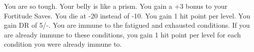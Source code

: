 {You are so tough. Your belly is like a prism.}
{You gain a +3 bonus to your Fortitude Saves.}
{You die at -20 instead of -10.}
{You gain 1 hit point per level.}
{You gain DR of 5/-.}
{You are immune to the fatigued and exhausted conditions. If you are already immune to these conditions, you gain 1 hit point per level for each condition you were already immune to.}